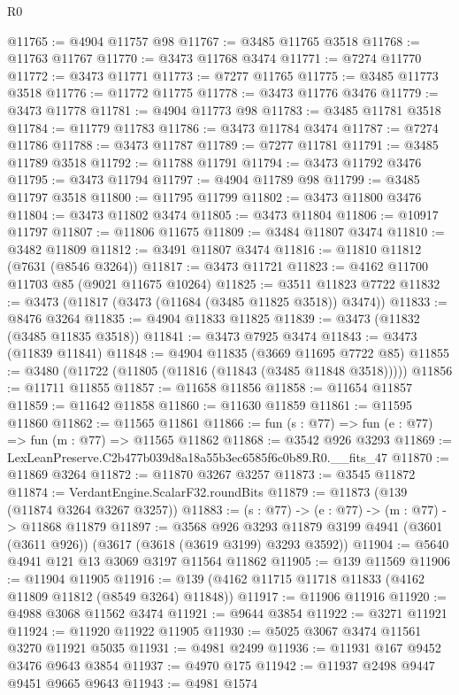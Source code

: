 \begin{lexlean}{R0}
\begin{coremodule}
@11765 := @4904 @11757 @98
@11767 := @3485 @11765 @3518
@11768 := @11763 @11767
@11770 := @3473 @11768 @3474
@11771 := @7274 @11770
@11772 := @3473 @11771
@11773 := @7277 @11765
@11775 := @3485 @11773 @3518
@11776 := @11772 @11775
@11778 := @3473 @11776 @3476
@11779 := @3473 @11778
@11781 := @4904 @11773 @98
@11783 := @3485 @11781 @3518
@11784 := @11779 @11783
@11786 := @3473 @11784 @3474
@11787 := @7274 @11786
@11788 := @3473 @11787
@11789 := @7277 @11781
@11791 := @3485 @11789 @3518
@11792 := @11788 @11791
@11794 := @3473 @11792 @3476
@11795 := @3473 @11794
@11797 := @4904 @11789 @98
@11799 := @3485 @11797 @3518
@11800 := @11795 @11799
@11802 := @3473 @11800 @3476
@11804 := @3473 @11802 @3474
@11805 := @3473 @11804
@11806 := @10917 @11797
@11807 := @11806 @11675
@11809 := @3484 @11807 @3474
@11810 := @3482 @11809
@11812 := @3491 @11807 @3474
@11816 := @11810 @11812 (@7631 (@8546 @3264))
@11817 := @3473 @11721
@11823 := @4162 @11700 @11703 @85 (@9021 @11675 @10264)
@11825 := @3511 @11823 @7722
@11832 := @3473 (@11817 (@3473 (@11684 (@3485 @11825 @3518)) @3474))
@11833 := @8476 @3264
@11835 := @4904 @11833 @11825
@11839 := @3473 (@11832 (@3485 @11835 @3518))
@11841 := @3473 @7925 @3474
@11843 := @3473 (@11839 @11841)
@11848 := @4904 @11835 (@3669 @11695 @7722 @85)
@11855 := @3480 (@11722 (@11805 (@11816 (@11843 (@3485 @11848 @3518)))))
@11856 := @11711 @11855
@11857 := @11658 @11856
@11858 := @11654 @11857
@11859 := @11642 @11858
@11860 := @11630 @11859
@11861 := @11595 @11860
@11862 := @11565 @11861
@11866 := fun (s : @77) => fun (e : @77) => fun (m : @77) => @11565 @11862
@11868 := @3542 @926 @3293
@11869 := LexLeanPreserve.C2b477b039d8a18a55b3ec6585f6c0b89.R0.__fits_47
@11870 := @11869 @3264
@11872 := @11870 @3267 @3257
@11873 := @3545 @11872
@11874 := VerdantEngine.ScalarF32.roundBits
@11879 := @11873 (@139 (@11874 @3264 @3267 @3257))
@11883 := (s : @77) -> (e : @77) -> (m : @77) -> @11868 @11879
@11897 := @3568
    @926
    @3293
    @11879
    @3199
    @4941
    (@3601 (@3611 @926))
    (@3617 (@3618 (@3619 @3199) @3293 @3592))
@11904 := @5640 @4941 @121 @13 @3069 @3197 @11564 @11862
@11905 := @139 @11569
@11906 := @11904 @11905
@11916 := @139 (@4162 @11715 @11718 @11833 (@4162 @11809 @11812 (@8549 @3264) @11848))
@11917 := @11906 @11916
@11920 := @4988 @3068 @11562 @3474
@11921 := @9644 @3854
@11922 := @3271 @11921
@11924 := @11920 @11922 @11905
@11930 := @5025 @3067 @3474 @11561 @3270 @11921 @5035
@11931 := @4981 @2499
@11936 := @11931 @167 @9452 @3476 @9643 @3854
@11937 := @4970 @175
@11942 := @11937 @2498 @9447 @9451 @9665 @9643
@11943 := @4981 @1574

\end{coremodule}
\end{lexlean}
